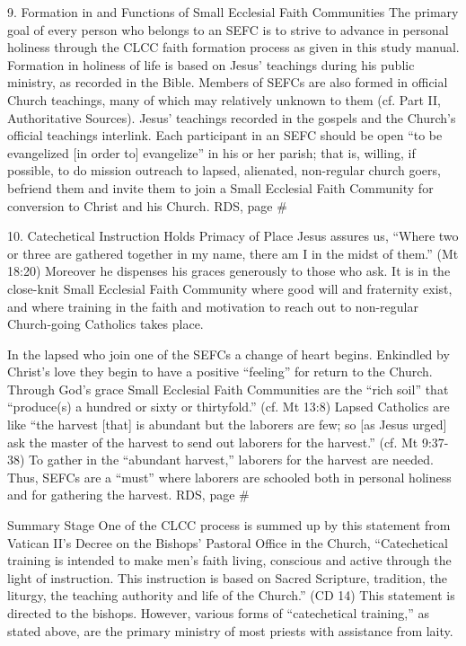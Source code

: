 \documentclass[oneside]{book}
\begin{document}
9. Formation in and Functions of Small Ecclesial Faith Communities
The primary goal of every person who belongs to an SEFC is to strive to advance
in personal holiness through the CLCC faith formation process as given in this
study manual. Formation in holiness of life is based on Jesus' teachings during
his public ministry, as recorded in the Bible. Members of SEFCs are also formed
in official Church teachings, many of which may relatively unknown to them
(cf. Part II, Authoritative Sources). Jesus' teachings recorded in the gospels
and the Church's official teachings interlink. Each participant in an SEFC
should be open ``to be evangelized [in order to] evangelize'' in his or her
parish; that is, willing, if possible, to do mission outreach to lapsed,
alienated, non-regular church goers, befriend them and invite them to join a
Small Ecclesial Faith Community for conversion to Christ and his Church.
RDS, page \#

10. Catechetical Instruction Holds Primacy of Place
Jesus assures us, ``Where two or three are gathered together in my name, there
am I in the midst of them.'' (Mt 18:20) Moreover he dispenses his graces
generously to those who ask. It is in the close-knit Small Ecclesial Faith
Community where good will and fraternity exist, and where training in the faith
and motivation to reach out to non-regular Church-going Catholics takes place.

In the lapsed who join one of the SEFCs a change of heart begins. Enkindled by
Christ's love they begin to have a positive ``feeling'' for return to the
Church. Through God's grace Small Ecclesial Faith Communities are the ``rich
soil'' that ``produce(s) a hundred or sixty or thirtyfold.'' (cf. Mt 13:8)
Lapsed Catholics are like ``the harvest [that] is abundant but the laborers are
few; so [as Jesus urged] ask the master of the harvest to send out laborers for
the harvest.'' (cf. Mt 9:37-38) To gather in the ``abundant harvest,'' laborers
for the harvest are needed. Thus, SEFCs are a ``must'' where laborers are
schooled both in personal holiness and for gathering the harvest.
RDS, page \#

Summary
Stage One of the CLCC process is summed up by this statement from Vatican II's
Decree on the Bishops' Pastoral Office in the Church, ``Catechetical training is
intended to make men's faith living, conscious and active through the light of
instruction. This instruction is based on Sacred Scripture, tradition, the
liturgy, the teaching authority and life of the Church.'' (CD 14) This statement
is directed to the bishops. However, various forms of ``catechetical training,''
as stated above, are the primary ministry of most priests with assistance from
laity.
\end{document}
